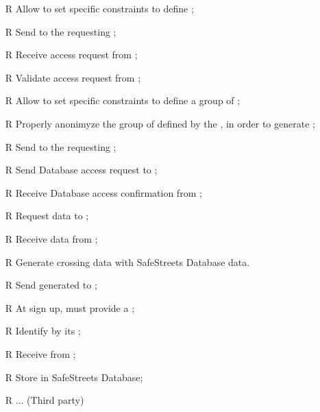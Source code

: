 \documentclass[../../../rasd.tex]{subfiles}
\begin{document}
\begin{itemize}
	\item[R\subs{18}]Allow  to set specific constraints to define ;
	\item[R\subs{19}]Send  to the requesting ;
	\item[R\subs{20}]Receive  access request from ;
	\item[R\subs{21}]Validate  access request from ;
	\item[R\subs{22}]Allow  to set specific constraints to define a group of ;
	\item[R\subs{23}]Properly anonimyze the group of  defined by the , in order to generate ;
	\item[R\subs{24}]Send  to the requesting ;
	\item[R\subs{25}]Send  Database access request to ; 
	\item[R\subs{26}]Receive  Database access confirmation from ;
	\item[R\subs{27}]Request  data to ;
	\item[R\subs{28}]Receive  data from ;
	\item[R\subs{29}]Generate  crossing   data with SafeStreets Database data.
	\item[R\subs{30}]Send generated  to ;
	\item[R\subs{31}]At sign up,  must provide a ;
	\item[R\subs{32}]Identify  by its ;
	\item[R\subs{33}]Receive  from ;
	\item[R\subs{34}]Store  in SafeStreets Database;
	\item[R\subs{}]... (Third party)
\end{itemize}
\end{document}
